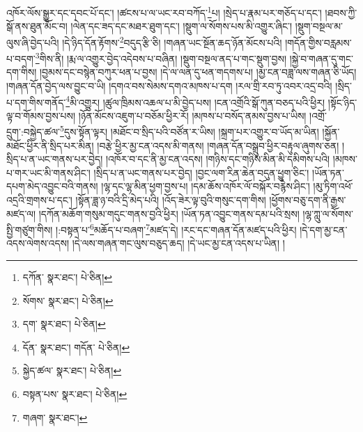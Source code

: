 འཁོར་ལོས་སྒྱུར་དང་དབང་པོ་དང་། །ཚངས་པ་ལ་ཡང་རབ་བཀོད་\footnote{དཀོན་  སྣར་ཐང་།  པེ་ཅིན། }པ། །སྲེད་པ་རྣམ་པར་གཅོད་པ་དང་། །ཐབས་ཀྱི་སྒོ་ནས་ཐུན་མོང་བ། །ལེན་དང་ཟད་དང་མཐར་ཐུག་དང་། །སྡུག་ལ་སོགས་པས་མི་འགྱུར་ཞིང་། །སྡུག་བསྔལ་མ་ལུས་ཞི་བྱེད་པའི། །དེ་ཉིད་དོན་རྟོགས་\footnote{སོགས་  སྣར་ཐང་།  པེ་ཅིན། }བདུད་རྩི་ཅི། །གཞན་ཡང་སྔོན་ཆད་ཉོན་མོངས་པའི། །གདོན་གྱིས་བརླམས་པ་བདག་\footnote{དག་  སྣར་ཐང་།  པེ་ཅིན། }གིས་ནི། །རྨ་ལ་འགྱུར་བྱེད་འདེབས་པ་བཞིན། །སྡུག་བསྔལ་ནད་པ་གང་སྡུག་བྱས། །སྐྱེ་བ་གཞན་དུ་གང་དག་གིས། །བྱམས་དང་བསྙེན་བཀུར་ཕན་པ་བྱས། །དེ་ལ་ལན་དུ་ཕན་གདགས་པ། །མྱ་ངན་བཟླ་ལས་གཞན་ཅི་ཡོད། །གཞན་དོན་བྱེད་ལས་བྱུང་བ་ཡི། །དགའ་བས་སེམས་དགའ་མཁས་པ་དག །རལ་གྲི་རབ་ཏུ་འབར་འདྲ་བའི། །སྲིད་པ་དག་གིས་གནོད་\footnote{དོན་  སྣར་ཐང་། གདོན་  པེ་ཅིན། }མི་འགྱུར། །ཚུལ་ཁྲིམས་འཆལ་པ་མི་བྱེད་པས། །ངན་འགྲོའི་སྒོ་ཀུན་བཅད་པའི་ཕྱིར། །སྟོང་ཉིད་ལྟ་བ་གོམས་བྱས་པས། །ཉོན་མོངས་འཇུག་པ་བཅོམ་ཕྱིར་རོ། །མཁས་པ་བསོད་ནམས་བྱས་པ་ཡིས། །འགྲོ་དྲུག་:བསྐྱེད་ཚལ་\footnote{སྐྱེད་ཚལ་  སྣར་ཐང་།  པེ་ཅིན། }དུས་སྟོན་ལྟར། །མཐོང་བ་སྲིད་པའི་བཙོན་ར་ཡིས། །སྐྲག་པར་འགྱུར་བ་ཡོད་མ་ཡིན། །སྐྱོན་མཐོང་ཕྱིར་ནི་སྲིད་པར་མིན། །བརྩེ་ཕྱིར་མྱ་ངན་འདས་མི་གནས། །གཞན་དོན་བསྒྲུབ་ཕྱིར་བརྟུལ་ཞུགས་ཅན། །སྲིད་པ་ན་ཡང་གནས་པར་བྱེད། །འཁོར་བ་དང་ནི་མྱ་ངན་འདས། །གཉིས་དང་གཉིས་མིན་མི་དམིགས་པའི། །མཁས་པ་གར་ཡང་མི་གནས་ཤིང་། །སྲིད་པ་ན་ཡང་གནས་པར་བྱེད། །བྱང་ལག་རིན་ཆེན་བདུན་ཕྱུག་ཅིང་། །ཡོན་ཏན་དཔག་མེད་འབྱུང་བའི་གནས། །ལྷ་དང་ལྷ་མིན་ཕྱག་བྱས་པ། །དམ་ཆོས་འཁོར་ལོ་བསྐོར་བརྙེས་ཤིང་། །མུ་ཏིག་འཕོ་འདྲའི་གྲགས་པ་དང་། །སྟོན་ཟླ་ཉ་བའི་དྲི་མེད་པའི། །འོད་ཟེར་ལྟ་བུའི་གསུང་དག་གིས། །ཕྱོགས་བཅུ་དག་ནི་རྒྱས་མཛད་ལ། །དཀོན་མཆོག་གསུམ་གདུང་གནས་བྱའི་ཕྱིར། །ཡོན་ཏན་འབྱུང་གནས་དམ་པའི་སྲས། །ལྷ་ཀླུ་ལ་སོགས་སྤྱི་གཙུག་གིས། །:བསྟན་པ་\footnote{བསྟན་པས་  སྣར་ཐང་།  པེ་ཅིན། }མཆོད་པ་བཞག་\footnote{གཞག་  སྣར་ཐང་། }མཛད་དེ། །རང་དང་གཞན་དོན་མཛད་པའི་ཕྱིར། །དེ་དག་མྱ་ངན་འདས་ལེགས་འདས། །དེ་ལས་གཞན་གང་ལུས་བཅུད་ཆད། །དེ་ཡང་མྱ་ངན་འདས་པ་ཡིན། །
